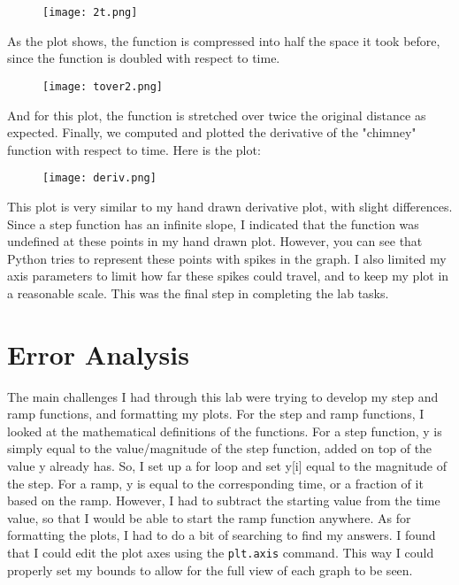 \documentclass[12pt]{report}
\begin{document}
{\begin{figure}[H]
    \centering
    \texttt{[image: 2t.png]}
\end{figure}

\noindent As the plot shows, the function is compressed into half the space it took before, since the function is doubled with respect to time.

\begin{figure}[H]
    \centering
    \texttt{[image: tover2.png]}
\end{figure}

\noindent And for this plot, the function is stretched over twice the original distance as expected. Finally, we computed and plotted the derivative of the "chimney" function with respect to time. Here is the plot:

\begin{figure}[H]
    \centering
    \texttt{[image: deriv.png]}
\end{figure}

\noindent This plot is very similar to my hand drawn derivative plot, with slight differences. Since a step function has an infinite slope, I indicated that the function was undefined at these points in my hand drawn plot. However, you can see that Python tries to represent these points with spikes in the graph. I also limited my axis parameters to limit how far these spikes could travel, and to keep my plot in a reasonable scale. This was the final step in completing the lab tasks.

\section{Error Analysis}
The main challenges I had through this lab were trying to develop my step and ramp functions, and formatting my plots. For the step and ramp functions, I looked at the mathematical definitions of the functions. For a step function, y is simply equal to the value/magnitude of the step function, added on top of the value y already has. So, I set up a for loop and set y[i] equal to the magnitude of the step. For a ramp, y is equal to the corresponding time, or a fraction of it based on the ramp. However, I had to subtract the starting value from the time value, so that I would be able to start the ramp function anywhere. As for formatting the plots, I had to do a bit of searching to find my answers. I found that I could edit the plot axes using the \texttt{plt.axis} command. This way I could properly set my bounds to allow for the full view of each graph to be seen. 

}
\end{document}
